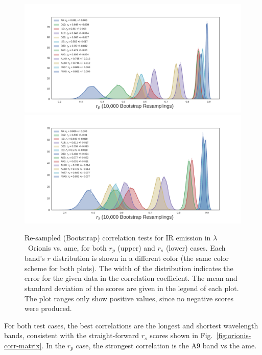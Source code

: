             \begin{figure}
              \includegraphics[width=\textwidth,trim={3cm 0.25cm 2.5cm 1cm},clip]{../Plots/ch_lori/bootstrap_vs_AME_pearson_i10000.pdf}
              \includegraphics[width=\textwidth,trim={3cm 0.25cm 2.5cm 1cm},clip]{../Plots/ch_lori/bootstrap_vs_AME_spearman_i10000.pdf}
              \centering
              \caption{Re-sampled (Bootstrap) correlation tests for IR emission in $\lambda$~Orionis vs. \acrshort{ame}, for both $r_{p}$ (upper) and $r_{s}$ (lower) cases. Each band's $r$ distribution is shown in a different color (the same color scheme for both plots). The width of the distribution indicates the error for the given data in the correlation coefficient. The mean and standard deviation of the scores are given in the legend of each plot. The plot ranges only show positive values, since no negative scores were produced. }
              \label{fig:bootstrap_vs_AME}
            \end{figure}
        For both test cases, the best correlations are the longest and shortest wavelength bands, consistent with the straight-forward $r_{s}$ scores shown in Fig.~\ref{fig:orionis-corr-matrix}. In the $r_{p}$ case, the strongest correlation is the A9 band vs the \acrshort{ame}.

